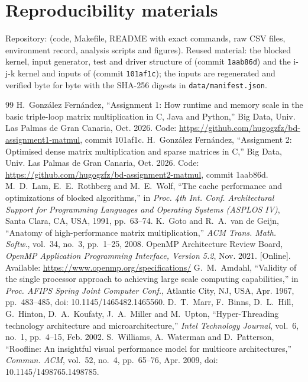 \section*{Reproducibility materials}
Repository: \repourl{} (code, Makefile, README with exact commands, raw CSV files, environment record, analysis scripts and figures). Reused material:
the blocked kernel, input generator, test and driver structure of \cite{a2} (commit \texttt{1aab86d}) and the i-j-k kernel and inputs of \cite{a1}
(commit \texttt{101af1c}); the inputs are regenerated and verified byte for byte with the SHA-256 digests in \texttt{data/manifest.json}.

\begin{thebibliography}{99}\small
{} H.~Gonz\'alez Fern\'andez, ``Assignment 1: How runtime and memory scale in the basic triple-loop matrix multiplication in C, Java and Python,'' Big Data, Univ. Las Palmas de Gran Canaria, Oct. 2026. Code: \url{https://github.com/hugogzfz/bd-assignment1-matmul}, commit 101af1c.
 H.~Gonz\'alez Fern\'andez, ``Assignment 2: Optimised dense matrix multiplication and sparse matrices in C,'' Big Data, Univ. Las Palmas de Gran Canaria, Oct. 2026. Code: \url{https://github.com/hugogzfz/bd-assignment2-matmul}, commit 1aab86d.
 M.~D.~Lam, E.~E.~Rothberg and M.~E.~Wolf, ``The cache performance and optimizations of blocked algorithms,'' in \emph{Proc. 4th Int. Conf. Architectural Support for Programming Languages and Operating Systems (ASPLOS IV)}, Santa Clara, CA, USA, 1991, pp.~63--74.
 K.~Goto and R.~A.~van de Geijn, ``Anatomy of high-performance matrix multiplication,'' \emph{ACM Trans. Math. Softw.}, vol.~34, no.~3, pp.~1--25, 2008.
 OpenMP Architecture Review Board, \emph{OpenMP Application Programming Interface, Version 5.2}, Nov. 2021. [Online]. Available: \url{https://www.openmp.org/specifications/}
 G.~M.~Amdahl, ``Validity of the single processor approach to achieving large scale computing capabilities,'' in \emph{Proc. AFIPS Spring Joint Computer Conf.}, Atlantic City, NJ, USA, Apr. 1967, pp.~483--485, doi: 10.1145/1465482.1465560.
 D.~T.~Marr, F.~Binns, D.~L.~Hill, G.~Hinton, D.~A.~Koufaty, J.~A.~Miller and M.~Upton, ``Hyper-Threading technology architecture and microarchitecture,'' \emph{Intel Technology Journal}, vol.~6, no.~1, pp.~4--15, Feb. 2002.
 S.~Williams, A.~Waterman and D.~Patterson, ``Roofline: An insightful visual performance model for multicore architectures,'' \emph{Commun. ACM}, vol.~52, no.~4, pp.~65--76, Apr. 2009, doi: 10.1145/1498765.1498785.

\end{thebibliography}
